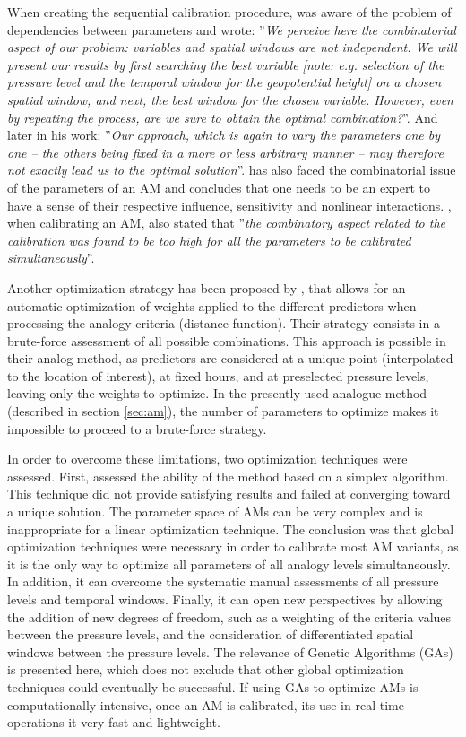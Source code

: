 \documentclass{ametsoc}
\begin{document}
When creating the sequential calibration procedure, \citet{Bontron2004} was aware of the problem of dependencies between parameters and wrote: ''\textit{We perceive here the combinatorial aspect of our problem: variables and spatial windows are not independent. We will present our results by first searching the best variable [note: e.g. selection of the pressure level and the temporal window for the geopotential height] on a chosen spatial window, and next, the best window for the chosen variable. However, even by repeating the process, are we sure to obtain the optimal combination?}''. And later in his work: ''\textit{Our approach, which is again to vary the parameters one by one -- the others being fixed in a more or less arbitrary manner -- may therefore not exactly lead us to the optimal solution}''. \citet{Bliefernicht2010} has also faced the combinatorial issue of the parameters of an AM and concludes that one needs to be an expert to have a sense of their respective influence, sensitivity and nonlinear interactions. \citet{BenDaoud2010}, when calibrating an AM, also stated that ''\textit{the combinatory aspect related to the calibration was found to be too high for all the parameters to be calibrated simultaneously}''.

Another optimization strategy has been proposed by \citet{Junk2015}, that allows for an automatic optimization of weights applied to the different predictors when processing the analogy criteria (distance function). Their strategy consists in a brute-force assessment of all possible combinations. This approach is possible in their analog method, as predictors are considered at a unique point (interpolated to the location of interest), at fixed hours, and at preselected pressure levels, leaving only the weights to optimize. In the presently used analogue method (described in section \ref{sec:am}), the number of parameters to optimize makes it impossible to proceed to a brute-force strategy.

In order to overcome these limitations, two optimization techniques were assessed. First, \citet{Horton2012a} assessed the ability of the \citet{Nelder1965a} method based on a simplex algorithm. This technique did not provide satisfying results and failed at converging toward a unique solution. The parameter space of AMs can be very complex and is inappropriate for a linear optimization technique. The conclusion was that global optimization techniques were necessary in order to calibrate most AM variants, as it is the only way to optimize all parameters of all analogy levels simultaneously. In addition, it can overcome the systematic manual assessments of all pressure levels and temporal windows. Finally, it can open new perspectives by allowing the addition of new degrees of freedom, such as a weighting of the criteria values between the pressure levels, and the consideration of differentiated spatial windows between the pressure levels. The relevance of Genetic Algorithms (GAs) is presented here, which does not exclude that other global optimization techniques could eventually be successful. If using GAs to optimize AMs is computationally intensive, once an AM is calibrated, its use in real-time operations it very fast and lightweight.
\end{document}
